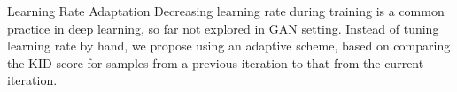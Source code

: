 \documentclass[xcolor={table}]{beamer}
\begin{document}
\begin{frame}{}
\begin{columns}[T, totalwidth=\textwidth]
\begin{column}{.32\textwidth}
\begin{figure}
      \label{fig:fid-kid-bias}
    \end{figure}
    \begin{block}{Learning Rate Adaptation}
      Decreasing learning rate during training is a common practice in deep learning, 
      so far not explored in GAN setting. Instead of tuning learning rate by hand, we propose 
      using an adaptive scheme, based on comparing the KID score for samples from a previous 
      iteration to that from the current iteration.
    \end{block}
     \printbibliography
  \end{column}

\end{columns}


\end{frame}
\end{document}
